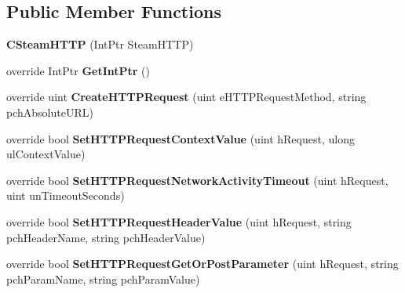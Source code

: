 \subsection*{Public Member Functions}
\begin{DoxyCompactItemize}
\item 
\hypertarget{classValve_1_1Steamworks_1_1CSteamHTTP_acba8ea39452953e95ebad06723c674b0}{}{\bfseries C\+Steam\+H\+T\+T\+P} (Int\+Ptr Steam\+H\+T\+T\+P)\label{classValve_1_1Steamworks_1_1CSteamHTTP_acba8ea39452953e95ebad06723c674b0}

\item 
\hypertarget{classValve_1_1Steamworks_1_1CSteamHTTP_af21c352eea493bd76bdaa2a83a0e54f7}{}override Int\+Ptr {\bfseries Get\+Int\+Ptr} ()\label{classValve_1_1Steamworks_1_1CSteamHTTP_af21c352eea493bd76bdaa2a83a0e54f7}

\item 
\hypertarget{classValve_1_1Steamworks_1_1CSteamHTTP_a6a5ce99b485df0037cea40c9b3a02e1d}{}override uint {\bfseries Create\+H\+T\+T\+P\+Request} (uint e\+H\+T\+T\+P\+Request\+Method, string pch\+Absolute\+U\+R\+L)\label{classValve_1_1Steamworks_1_1CSteamHTTP_a6a5ce99b485df0037cea40c9b3a02e1d}

\item 
\hypertarget{classValve_1_1Steamworks_1_1CSteamHTTP_a5e43d6a0321fce79788ee051705866c9}{}override bool {\bfseries Set\+H\+T\+T\+P\+Request\+Context\+Value} (uint h\+Request, ulong ul\+Context\+Value)\label{classValve_1_1Steamworks_1_1CSteamHTTP_a5e43d6a0321fce79788ee051705866c9}

\item 
\hypertarget{classValve_1_1Steamworks_1_1CSteamHTTP_a21959adf6e170f5acd5168b1d76a1d1e}{}override bool {\bfseries Set\+H\+T\+T\+P\+Request\+Network\+Activity\+Timeout} (uint h\+Request, uint un\+Timeout\+Seconds)\label{classValve_1_1Steamworks_1_1CSteamHTTP_a21959adf6e170f5acd5168b1d76a1d1e}

\item 
\hypertarget{classValve_1_1Steamworks_1_1CSteamHTTP_a2159e9484c5186af3424d72fa8b2c181}{}override bool {\bfseries Set\+H\+T\+T\+P\+Request\+Header\+Value} (uint h\+Request, string pch\+Header\+Name, string pch\+Header\+Value)\label{classValve_1_1Steamworks_1_1CSteamHTTP_a2159e9484c5186af3424d72fa8b2c181}

\item 
\hypertarget{classValve_1_1Steamworks_1_1CSteamHTTP_a4449744cc4d6f22cc28aa77c376f5aec}{}override bool {\bfseries Set\+H\+T\+T\+P\+Request\+Get\+Or\+Post\+Parameter} (uint h\+Request, string pch\+Param\+Name, string pch\+Param\+Value)\label{classValve_1_1Steamworks_1_1CSteamHTTP_a4449744cc4d6f22cc28aa77c376f5aec}


\end{DoxyCompactItemize}
